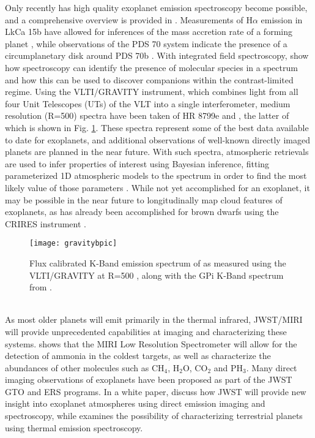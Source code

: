 Only recently has high quality exoplanet emission spectroscopy become possible, and a comprehensive overview is provided in \parencite{Biller2018}.
Measurements of H$\alpha$ emission in LkCa 15b have allowed for inferences of the mass accretion rate of a forming planet \parencite{Sallum2015}, while observations of the PDS 70 system indicate the presence of a circumplanetary disk around PDS 70b \parencite{Keppler2018,Christiaens2019}.
With integrated field spectroscopy, \parencite{Hoeijmakers2018} show how spectroscopy can identify the presence of molecular species in a spectrum and how this can be used to discover companions within the contrast-limited regime.
Using the VLTI/GRAVITY instrument, which combines light from all four Unit Telescopes (UTs) of the VLT into a single interferometer, medium resolution (R=500) spectra have been taken of HR 8799e \parencite{Lacour2019} and \bpic \parencite{GRAVITYCollaboration2019}, the latter of which is shown in Fig. \ref{fig:gravitybpic}. 
These spectra represent some of the best data available to date for exoplanets, and additional observations of well-known directly imaged planets are planned in the near future.
With such spectra, atmospheric retrievals are used to infer properties of interest using Bayesian inference, fitting parameterized 1D atmospheric models to the spectrum in order to find the most likely value of those parameters \parencite{Madhusudhan2009}. 
While not yet accomplished for an exoplanet, it may be possible in the near future to longitudinally map cloud features of exoplanets, as has already been accomplished for brown dwarfs using the CRIRES instrument \parencite{Crossfield2014}.
\begin{figure}[t]
	\texttt{[image: gravitybpic]}
	\caption{Flux calibrated K-Band emission spectrum of \bpic as measured using the VLTI/GRAVITY at R=500 \parencite{GRAVITYCollaboration2019}, along with the GPi K-Band spectrum from \parencite{Chilcote2017}.}
	\label{fig:gravitybpic}
\end{figure}\\

As most older planets will emit primarily in the thermal infrared, JWST/MIRI will provide unprecedented capabilities at imaging and characterizing these systems.
\parencite{Danielski2018} shows that the MIRI Low Resolution Spectrometer will allow for the detection of ammonia in the coldest targets, as well as characterize the abundances of other molecules such as CH$_{4}$, H$_{2}$O, CO$_{2}$ and PH$_{3}$.
Many direct imaging observations of exoplanets have been proposed as part of the JWST GTO and ERS programs. In a white paper, \parencite{Beichman2019} discuss how JWST will provide new insight into exoplanet atmospheres using direct emission imaging and spectroscopy, while \parencite{Line2019} examines the possibility of characterizing terrestrial planets using thermal emission spectroscopy. 


